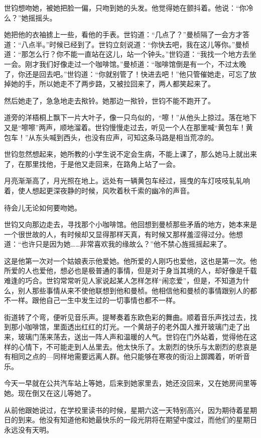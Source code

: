 \par 世钧想吻她，被她把脸一偏，只吻到她的头发。他觉得她在颤抖着。他说：“你冷么？”她摇摇头。
\par 她把他的衣袖掳上一些，看他的手表。世钧道：“几点了？”曼桢隔了一会方才答道：“八点半。”时候已经到了。世钧立刻说道：“你快去吧，我在这儿等你。”曼桢道：“那怎么行？你不能一直站在这儿，站一个钟头。”世钧道：“我找一个地方去坐一会。刚才我们好像走过一个咖啡馆。”曼桢道：“咖啡馆倒是有一个，不过太晚了，你还是回去吧。”世钧道：“你就别管了！快进去吧！”他只管催她走，可忘了放掉她的手，所以她走不了两步路，又被拉回来了，两人都笑起来了。
\par 然后她走了，急急地走去揿铃。她那边一揿铃，世钧不能不跑开了。
\par 道旁的洋梧桐上飘下一片大叶子，像一只鸟似的，“嚓！”从他头上掠过。落在地下又是“嚓嚓”两声，顺地溜着。世钧慢慢走过去，听见一个人在那里喊“黄包车！黄包车！”从东头喊到西头，也没有应声，可知这条马路是相当荒凉的。
\par 世钧忽然想起来，她所教的小学生说不定会生病，不能上课了，那么她马上就出来了，在那里找他，于是他又走回来，在路角上站了一会。
\par 月亮渐渐高了，月光照在地上。远处有一辆黄包车经过，摇曳的车灯吱吱轧轧响着，使人想起更深夜静的时候，风吹着秋千索的幽冷的声音。
\par 待会儿无论如何要吻她。
\par 世钧又向那边走去，寻找那个小咖啡馆。他回想到曼桢那些矛盾的地方，她本来是一个很世故的人，有时候却又显得那样天真，有时候又那样羞涩得过分。他想道：“也许只是因为她……非常喜欢我的缘故么？”他不禁心旌摇摇起来了。
\par 这是他第一次对一个姑娘表示他爱她。他所爱的人刚巧也爱他，这也是第一次。他所爱的人也爱他，想必也是极普通的事情，但是对于身当其境的人，却好像是千载难逢的巧合。世钧常常听见人家说起某人怎样怎样“闹恋爱”，但是，不知道为什么，别人那些事情从来不使他联想到他和曼桢。他相信他和曼桢的事情跟别人的都不一样。跟他自己一生中发生过的一切事情也都不一样。
\par 街道转了个弯，便听见音乐声。提琴奏着东欧色彩的舞曲。顺着音乐声找过去，找到那小咖啡馆，里面透出红红的灯光。一个黄胡子的老外国人推开玻璃门走了出来，玻璃门荡来荡去，送出一阵人声和温暖的人气。世钧在门外站着，觉得他在这样的心情下，不可能走到人丛里去。他太快乐了。太剧烈的快乐与太剧烈的悲哀是有相同之点的—同样地需要远离人群。他只能够在寒夜的街沿上踯躅着，听听音乐。
\par 今天一早就在公共汽车站上等她，后来到她家里去，她还没回来，又在她房间里等她。现在倒又在这儿等她了。
\par 从前他跟她说过，在学校里读书的时候，星期六这一天特别高兴，因为期待着星期日的到来。他没有知道他和她最快乐的一段光阴将在期望中度过，而他们的星期日永远没有天明。

